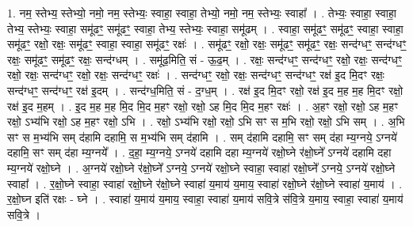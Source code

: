 \documentclass[17pt]{extarticle}
\begin{document}
1. नम॒ स्तेभ्य॒ स्तेभ्यो॒ नमो॒ नम॒ स्तेभ्यः॒ स्वाहा॒ स्वाहा॒ तेभ्यो॒ नमो॒ नम॒ स्तेभ्यः॒ स्वाहा᳚ । . तेभ्यः॒ स्वाहा॒ स्वाहा॒ तेभ्य॒ स्तेभ्यः॒ स्वाहा॒ समू॑ढꣳ॒॒ समू॑ढꣳ॒॒ स्वाहा॒ तेभ्य॒ स्तेभ्यः॒ स्वाहा॒ समू॑ढम् । . स्वाहा॒ समू॑ढꣳ॒॒ समू॑ढꣳ॒॒ स्वाहा॒ स्वाहा॒ समू॑ढꣳ॒॒ रक्षो॒ रक्षः॒ समू॑ढꣳ॒॒ स्वाहा॒ स्वाहा॒ समू॑ढꣳ॒॒ रक्षः॑ । . समू॑ढꣳ॒॒ रक्षो॒ रक्षः॒ समू॑ढꣳ॒॒ समू॑ढꣳ॒॒ रक्षः॒ सन्द॑ग्धꣳ॒॒ सन्द॑ग्धꣳ॒॒ रक्षः॒ समू॑ढꣳ॒॒ समू॑ढꣳ॒॒ रक्षः॒ सन्द॑ग्धम् । . समू॑ढ॒मिति॒ सं - ऊ॒ढ॒म् । . रक्षः॒ सन्द॑ग्धꣳ॒॒ सन्द॑ग्धꣳ॒॒ रक्षो॒ रक्षः॒ सन्द॑ग्धꣳ॒॒ रक्षो॒ रक्षः॒ सन्द॑ग्धꣳ॒॒ रक्षो॒ रक्षः॒ सन्द॑ग्धꣳ॒॒ रक्षः॑ । . सन्द॑ग्धꣳ॒॒ रक्षो॒ रक्षः॒ सन्द॑ग्धꣳ॒॒ सन्द॑ग्धꣳ॒॒ रक्ष॑ इ॒द मि॒दꣳ रक्षः॒ सन्द॑ग्धꣳ॒॒ सन्द॑ग्धꣳ॒॒ रक्ष॑ इ॒दम् । . सन्द॑ग्ध॒मिति॒ सं - द॒ग्ध॒म् । . रक्ष॑ इ॒द मि॒दꣳ रक्षो॒ रक्ष॑ इ॒द म॒ह म॒ह मि॒दꣳ रक्षो॒ रक्ष॑ इ॒द म॒हम् । . इ॒द म॒ह म॒ह मि॒द मि॒द म॒हꣳ रक्षो॒ रक्षो॒ ऽह मि॒द मि॒द म॒हꣳ रक्षः॑ । . अ॒हꣳ रक्षो॒ रक्षो॒ ऽह म॒हꣳ रक्षो॒ ऽभ्य॑भि रक्षो॒ ऽह म॒हꣳ रक्षो॒ ऽभि । . रक्षो॒ ऽभ्य॑भि रक्षो॒ रक्षो॒ ऽभि सꣳ स म॒भि रक्षो॒ रक्षो॒ ऽभि सम् । . अ॒भि सꣳ स म॒भ्य॑भि सम् द॑हामि दहामि॒ स म॒भ्य॑भि सम् द॑हामि । . सम् द॑हामि दहामि॒ सꣳ सम् द॑हा म्य॒ग्नये॒ ऽग्नये॑ दहामि॒ सꣳ सम् द॑हा म्य॒ग्नये᳚ । . द॒हा॒ म्य॒ग्नये॒ ऽग्नये॑ दहामि दहा म्य॒ग्नये॑ रक्षो॒घ्ने र॑क्षो॒घ्ने᳚ ऽग्नये॑ दहामि दहा म्य॒ग्नये॑ रक्षो॒घ्ने । . अ॒ग्नये॑ रक्षो॒घ्ने र॑क्षो॒घ्ने᳚ ऽग्नये॒ ऽग्नये॑ रक्षो॒घ्ने स्वाहा॒ स्वाहा॑ रक्षो॒घ्ने᳚ ऽग्नये॒ ऽग्नये॑ रक्षो॒घ्ने स्वाहा᳚ । . र॒क्षो॒घ्ने स्वाहा॒ स्वाहा॑ रक्षो॒घ्ने र॑क्षो॒घ्ने स्वाहा॑ य॒माय॑ य॒माय॒ स्वाहा॑ रक्षो॒घ्ने र॑क्षो॒घ्ने स्वाहा॑ य॒माय॑ । . र॒क्षो॒घ्न इति॑ रक्षः - घ्ने । . स्वाहा॑ य॒माय॑ य॒माय॒ स्वाहा॒ स्वाहा॑ य॒माय॑ सवि॒त्रे स॑वि॒त्रे य॒माय॒ स्वाहा॒ स्वाहा॑ य॒माय॑ सवि॒त्रे । \newline
\end{document}

